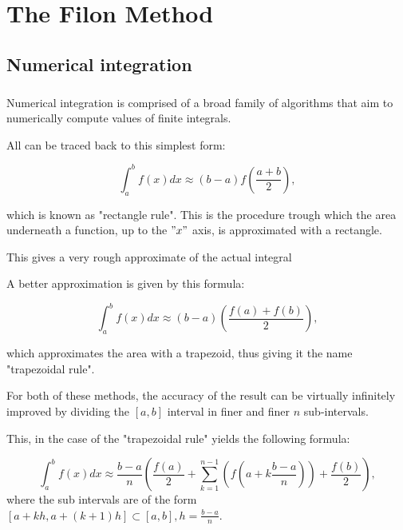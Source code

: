 \chapter{The Filon Method}
\label{cap:cap2}

\section{Numerical integration}

\paragraph{} Numerical integration is comprised of a broad family of algorithms that aim to numerically compute values of finite integrals.

All can be traced back to this simplest form:

\begin{equation}
    \int_a^b f(x) dx \approx (b-a) f\left(\frac{a+b}{2}\right),\label{rectangle}
\end{equation}

which is known as "rectangle rule". This is the procedure trough which the area underneath a function, up to the $"x"$ axis, is approximated with a rectangle. 

This gives a very rough approximate of the actual integral



A better approximation is given by this formula: 

\begin{equation}
    \int_a^b f(x) dx \approx (b-a) \left(\frac{f(a)+f(b)}{2}\right),\label{trapezoid}
\end{equation}

which approximates the area with a trapezoid, thus giving it the name "trapezoidal rule".


For both of these methods, the accuracy of the result can be virtually infinitely improved by dividing the $[a,b]$ interval in finer and finer $n$ sub-intervals.

This, in the case of the "trapezoidal rule" yields the following formula:

\begin{equation}
    \int_a^b f(x) dx \approx \frac{b-a}{n}\left(\frac{f(a)}{2}+\sum_{k=1}^{n-1}\left(f\left(a+k\frac{b-a}{n}\right)\right)+\frac{f(b)}{2}\right),\label{composite}
\end{equation}
where the sub intervals are of the form $ [a+kh,a+(k+1)h] \subset [a,b], h=\frac{b-a}{n} $.

